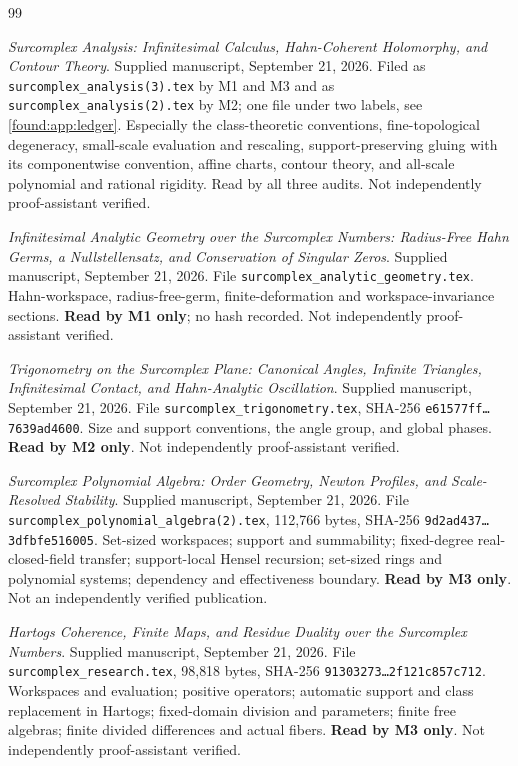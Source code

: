 \documentclass[11pt,letterpaper]{article}
\numberwithin{equation}{section}
\theoremstyle{definition}
\theoremstyle{remark}
\begin{document}
\begingroup\small
\begin{thebibliography}{99}
\setlength{\itemsep}{0.4em}\raggedright

\emph{Surcomplex Analysis: Infinitesimal Calculus, Hahn-Coherent Holomorphy, and
Contour Theory}. Supplied manuscript, September 21, 2026. Filed as
\texttt{surcomplex\_analysis(3).tex} by M1 and M3 and as
\texttt{surcomplex\_analysis(2).tex} by M2; one file under two labels, see
\cref{found:app:ledger}. Especially the class-theoretic conventions,
fine-topological degeneracy, small-scale evaluation and rescaling,
support-preserving gluing with its componentwise convention, affine charts,
contour theory, and all-scale polynomial and rational rigidity. Read by all
three audits. Not independently proof-assistant verified.

\emph{Infinitesimal Analytic Geometry over the Surcomplex Numbers: Radius-Free
Hahn Germs, a Nullstellensatz, and Conservation of Singular Zeros}. Supplied
manuscript, September 21, 2026. File
\texttt{surcomplex\_analytic\_geometry.tex}. Hahn-workspace, radius-free-germ,
finite-deformation and workspace-invariance sections. \textbf{Read by M1 only};
no hash recorded. Not independently proof-assistant verified.

\emph{Trigonometry on the Surcomplex Plane: Canonical Angles, Infinite
Triangles, Infinitesimal Contact, and Hahn-Analytic Oscillation}. Supplied
manuscript, September 21, 2026. File \texttt{surcomplex\_trigonometry.tex},
SHA-256 \texttt{e61577ff\ldots7639ad4600}. Size and support conventions, the
angle group, and global phases. \textbf{Read by M2 only}. Not independently
proof-assistant verified.

\emph{Surcomplex Polynomial Algebra: Order Geometry, Newton Profiles, and
Scale-Resolved Stability}. Supplied manuscript, September 21, 2026. File
\texttt{surcomplex\_polynomial\_algebra(2).tex}, 112{,}766 bytes, SHA-256
\texttt{9d2ad437\ldots3dfbfe516005}. Set-sized workspaces; support and
summability; fixed-degree real-closed-field transfer; support-local Hensel
recursion; set-sized rings and polynomial systems; dependency and effectiveness
boundary. \textbf{Read by M3 only}. Not an independently verified publication.

\emph{Hartogs Coherence, Finite Maps, and Residue Duality over the Surcomplex
Numbers}. Supplied manuscript, September 21, 2026. File
\texttt{surcomplex\_research.tex}, 98{,}818 bytes, SHA-256
\texttt{91303273\ldots2f121c857c712}. Workspaces and evaluation; positive
operators; automatic support and class replacement in Hartogs; fixed-domain
division and parameters; finite free algebras; finite divided differences and
actual fibers. \textbf{Read by M3 only}. Not independently proof-assistant
verified.


\end{thebibliography}
\end{document}
